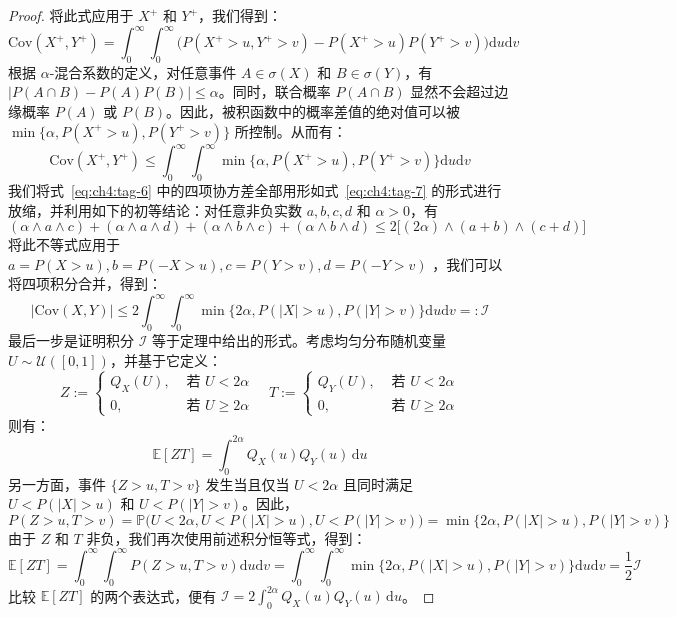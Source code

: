 \begin{proof}
将此式应用于 $X^{+}$ 和 $Y^{+}$，我们得到：
\[\mathrm{Cov}(X^{+},Y^{+}) = \int_{0}^{\infty} \!\!\int_{0}^{\infty} \Big( P(X^{+} > u, Y^{+} > v) - P(X^{+} > u)P(Y^{+} > v) \Big)  \mathrm{d}u  \mathrm{d}v\]
根据 $\alpha$-混合系数的定义，对任意事件 $A \in \sigma(X)$ 和 $B \in \sigma(Y)$，有 $|P(A \cap B) - P(A)P(B)| \leq \alpha$。同时，联合概率 $P(A \cap B)$ 显然不会超过边缘概率 $P(A)$ 或 $P(B)$。因此，被积函数中的概率差值的绝对值可以被 $\min \big\{\alpha, P(X^{+} > u), P(Y^{+} > v) \big\}$ 所控制。从而有：
\[\mathrm{Cov}(X^{+},Y^{+}) \leq \int_{0}^{\infty} \!\!\int_{0}^{\infty}\min \big\{ \alpha, P(X^{+} > u), P(Y^{+} > v) \big\} \mathrm{d}u  \mathrm{d}v\]
我们将式~\eqref{eq:ch4:tag-6} 中的四项协方差全部用形如式~\eqref{eq:ch4:tag-7} 的形式进行放缩，并利用如下的初等结论：对任意非负实数 $a, b, c, d$ 和 $\alpha > 0$，有
\[(\alpha \wedge a \wedge c) + (\alpha \wedge a \wedge d) + (\alpha \wedge b \wedge c) + (\alpha \wedge b \wedge d) \leq 2\big[ (2\alpha) \wedge (a + b) \wedge (c + d) \big]\]
将此不等式应用于 $a = P(X > u), b = P(-X > u), c = P(Y > v), d = P(-Y > v)$ ，我们可以将四项积分合并，得到：
\[|\mathrm{Cov}(X,Y)| \leq 2\int_{0}^{\infty} \!\!\int_{0}^{\infty}\min \big\{ 2\alpha, P(|X| > u), P(|Y| > v) \big\} \mathrm{d}u  \mathrm{d}v =: \mathcal{I}\]
最后一步是证明积分 $\mathcal{I}$ 等于定理中给出的形式。考虑均匀分布随机变量 $U\sim\mathcal U([0,1])$，并基于它定义：
\[Z:=\begin{cases} Q_X(U),&\text{ 若 }U<2\alpha\\ 0,&\text{ 若 }U\ge 2\alpha \end{cases}\quad T:=\begin{cases} Q_Y(U),&\text{ 若 }U<2\alpha\\ 0,&\text{ 若 }U\ge 2\alpha \end{cases}\]
则有：
\[\mathbb{E}[ZT] = \int_{0}^{2\alpha} Q_{X}(u) Q_{Y}(u) \, \mathrm{d}u\]
另一方面，事件 $\{Z > u, T > v\}$ 发生当且仅当 $U < 2\alpha$ 且同时满足 $U < P(|X| > u)$ 和 $U < P(|Y| > v)$。因此，
\[P(Z > u, T > v) = \mathbb{P}\big(U < 2\alpha, U < P(|X| > u), U < P(|Y| > v) \big) = \min\big\{ 2\alpha, P(|X| > u), P(|Y| > v) \}\]
由于 $Z$ 和 $T$ 非负，我们再次使用前述积分恒等式，得到：
\[\mathbb{E}[ZT] =\int_{0}^{\infty} \!\!\int_{0}^{\infty}P(Z > u, T > v) \mathrm{d}u \mathrm{d}v = \int_{0}^{\infty} \!\!\int_{0}^{\infty}\min\big\{ 2\alpha, P(|X| > u), P(|Y| > v) \big\}  \mathrm{d}u \mathrm{d}v = \frac{1}{2} \mathcal{I}\]
比较 $\mathbb{E}[ZT]$ 的两个表达式，便有 $\mathcal{I} = 2 \int_{0}^{2\alpha} Q_{X}(u) Q_{Y}(u) \, \mathrm{d}u$。

\end{proof}

